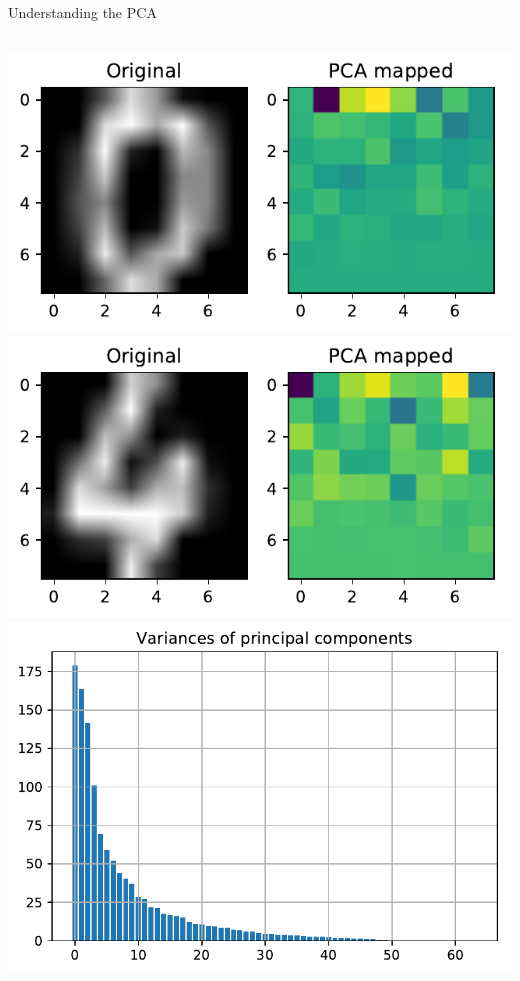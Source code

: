 \documentclass[10pt, aspectratio=169]{beamer} %
\begin{document}
\begin{frame}[fragile, allowframebreaks=0.8]{Understanding the PCA}
\begin{columns}
		\begin{center}
		  \includegraphics[width=\columnwidth]{digits_pca_proj_example1.pdf}\\
			\includegraphics[width=\columnwidth]{digits_pca_proj_example2.pdf}\\
			\includegraphics[width=\columnwidth]{digits_pca_proj_vars.pdf}
		\end{center}
		\end{columns}
\end{frame}
\end{document}
